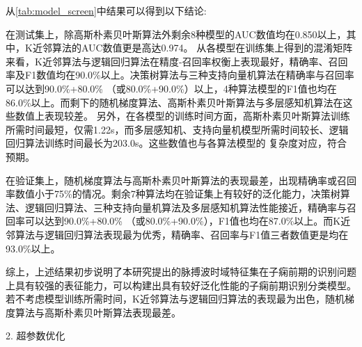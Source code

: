 从\autoref{tab:model_screen}中结果可以得到以下结论:

 在测试集上，除高斯朴素贝叶斯算法外剩余8种模型的AUC数值均在0.850以上，其中，K近邻算法的AUC数值更是高达0.974。
从各模型在训练集上得到的混淆矩阵来看，K近邻算法与逻辑回归算法在精度-召回率权衡上表现最好，精确率、召回率及F1数值均在90.0\%以上。决策树算法与三种支持向量机算法在精确率与召回率可以达到90.0\%+80.0\%
（或80.0\%+90.0\%）以上，4种算法模型的F1值也均在86.0\%以上。而剩下的随机梯度算法、高斯朴素贝叶斯算法与多层感知机算法在这些数值上表现较差。
另外，在各模型的训练时间方面，高斯朴素贝叶斯算法训练所需时间最短，仅需1.22s，而多层感知机、支持向量机模型所需时间较长、逻辑回归算法训练时间最长为203.0s。这些数值也与各算法模型的
复杂度对应，符合预期。

 在验证集上，随机梯度算法与高斯朴素贝叶斯算法的表现最差，出现精确率或召回率数值小于75\%的情况。剩余7种算法均在验证集上有较好的泛化能力，决策树算法、逻辑回归算法、三种支持向量机算法及多层感知机算法性能接近，精确率与召回率可以达到90.0\%+80.0\%
（或80.0\%+90.0\%），F1值也均在87.0\%以上。而K近邻算法与逻辑回归算法表现最为优秀，精确率、召回率与F1值三者数值更是均在93.0\%以上。

综上，上述结果初步说明了本研究提出的脉搏波时域特征集在子痫前期的识别问题上具有较强的表征能力，可以构建出具有较好泛化性能的子痫前期识别分类模型。
若不考虑模型训练所需时间，K近邻算法与逻辑回归算法的表现最为出色，随机梯度算法与高斯朴素贝叶斯算法表现最差。

2. 超参数优化

